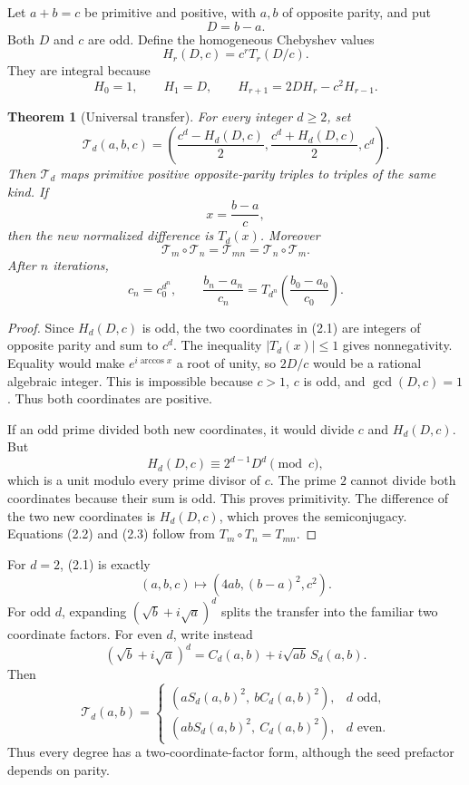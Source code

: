 \documentclass[11pt]{article}
\newtheorem{theorem}{Theorem}
\theoremstyle{definition}
\theoremstyle{remark}
\newcommand{\T}{\mathcal T}
\begin{document}
Let $a+b=c$ be primitive and positive, with $a,b$ of opposite parity,
and put
\[
 D=b-a.
\]
Both $D$ and $c$ are odd.  Define the homogeneous Chebyshev values
\[
 H_r(D,c)=c^rT_r(D/c).
\]
They are integral because
\[
 H_0=1,\qquad H_1=D,\qquad
 H_{r+1}=2D H_r-c^2H_{r-1}.
\]

\begin{theorem}[Universal transfer]\label{thm:transfer}
For every integer $d\ge2$, set
\[
 \T_d(a,b,c)=
 \left(
 \frac{c^d-H_d(D,c)}2,
 \frac{c^d+H_d(D,c)}2,
 c^d
 \right).
 \tag{2.1}
\]
Then \(\T_d\) maps primitive positive opposite-parity triples to triples
of the same kind.  If
\[
 x=\frac{b-a}{c},
\]
then the new normalized difference is $T_d(x)$.  Moreover
\[
 \T_m\circ\T_n=\T_{mn}=\T_n\circ\T_m.
 \tag{2.2}
\]
After $n$ iterations,
\[
 c_n=c_0^{d^n},\qquad
 \frac{b_n-a_n}{c_n}
 =T_{d^n}\left(\frac{b_0-a_0}{c_0}\right).
 \tag{2.3}
\]
\end{theorem}

\begin{proof}
Since $H_d(D,c)$ is odd, the two coordinates in (2.1) are integers of
opposite parity and sum to $c^d$.  The inequality
$|T_d(x)|\le1$ gives nonnegativity.  Equality would make
$e^{i\arccos x}$ a root of unity, so $2D/c$ would be a rational
algebraic integer.  This is impossible because $c>1$, $c$ is odd, and
$\gcd(D,c)=1$.  Thus both coordinates are positive.

If an odd prime divided both new coordinates, it would divide $c$ and
$H_d(D,c)$.  But
\[
 H_d(D,c)\equiv 2^{d-1}D^d\pmod c,
\]
which is a unit modulo every prime divisor of $c$.  The prime $2$
cannot divide both coordinates because their sum is odd.  This proves
primitivity.  The difference of the two new coordinates is $H_d(D,c)$,
which proves the semiconjugacy.  Equations (2.2) and (2.3) follow from
$T_m\circ T_n=T_{mn}$.
\end{proof}

For $d=2$, (2.1) is exactly
\[
 (a,b,c)\longmapsto(4ab,(b-a)^2,c^2).
 \tag{2.4}
\]
For odd $d$, expanding
\((\sqrt b+i\sqrt a)^d\) splits the transfer into the familiar two
coordinate factors.  For even $d$, write instead
\[
 (\sqrt b+i\sqrt a)^d=C_d(a,b)+i\sqrt{ab}\,S_d(a,b).
\]
Then
\[
 \T_d(a,b)=
 \begin{cases}
 (aS_d(a,b)^2,\ bC_d(a,b)^2),&d\text{ odd},\\
 (abS_d(a,b)^2,\ C_d(a,b)^2),&d\text{ even}.
 \end{cases}
 \tag{2.5}
\]
Thus every degree has a two-coordinate-factor form, although the seed
prefactor depends on parity.
\end{document}
